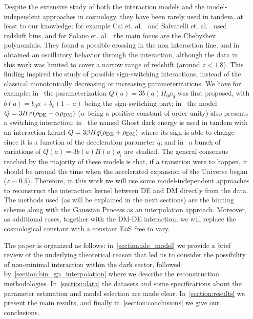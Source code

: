 \documentclass[twocolumn,a4paper,reprint,amssymb,aps,prd,groupedaddress,superscriptaddress,nofootinbib]{revtex4-2}
\begin{document}
Despite the extensive study of both the interaction models and the model-independent approaches in cosmology,
they have been rarely used in tandem, at least to our knowledge; for example Cai et. al.~\cite{Cai:2009ht}
and Salvatelli et. al.~\cite{Salvatelli:2014zta} used redshift bins, and for Solano et. al.~\cite{Solano:2012zw}
the main focus are the Chebyshev polynomials.
They found a possible crossing in the non interaction line, and in~\cite{Cai:2009ht} obtained an oscillatory
behavior through the interaction, although the data in this work was limited to cover a narrow range of
redshift (around $z<1.8$). This finding inspired the study of possible sign-switching interactions, instead
of the classical monotonically decreasing or increasing parameterizations. We have for example:
in~\cite{Li:2011ga} the parameterization $Q(a) = 3b(a)H_0\rho_0$ was first proposed, with $b(a) = b_0a
+b_e(1-a)$ being the sign-switching part; in~\cite{Sun:2010vz} the model $Q = 3H\sigma(\rho_{\rm DE} -
\alpha\rho_{\rm DM})$ ($\alpha$ being a positive constant of order unity) also presents a switching
interaction; in~\cite{Zadeh:2017zke} the named Ghost dark energy is used in tandem with an interaction kernel $Q =
3\beta H q (\rho_{\rm DE}+\rho_{\rm DM})$  where its sign is able to change since it is a function
of the deceleration parameter $q$; and in~\cite{Guo:2017deu} a bunch of variations of $Q(a) = 3b(a)H(a)\rho_i$
are studied. The general consensus reached by the majority of these models is that,
if a transition were to happen, it should be around the time when the accelerated expansion of the
Universe began ($z\sim0.5$).
%
Therefore, in this work we will use some model-independent approaches to reconstruct the
interaction kernel between DE and DM directly from the data. The methods used (as will be explained in the
next sections) are the binning scheme along with the  Gaussian Process as an interpolation approach. Moreover,
as additional cases, together with the DM-DE interaction, we will replace the cosmological constant with a
constant EoS free to vary.


The paper is organized as follows: in~\cref{section:ide_model} we provide a brief review of the
underlying theoretical reason that led us to consider the possibility of non-minimal interaction within the dark
sector, followed by~\cref{section:bin_gp_interpolation} where we describe the reconstruction methodologies.
In~\cref{section:data} the datasets and some specifications about the parameter estimation and model
selection are made clear. In~\cref{section:results} we present
the main results, and finally in~\cref{section:conclusions} we give our conclusions.
\end{document}
